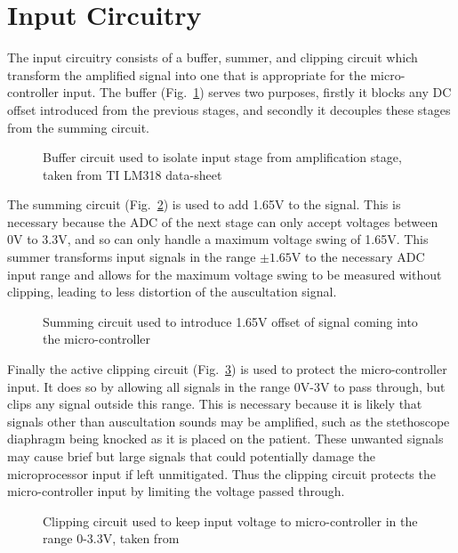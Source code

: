 \section{Input Circuitry}
The input circuitry consists of a buffer, summer, and clipping circuit which transform the amplified signal into one that is appropriate for the micro-controller input. The buffer (Fig.~\ref{fig:buffer_circuit}) serves two purposes, firstly it blocks any DC offset introduced from the previous stages, and secondly it decouples these stages from the summing circuit. 
\begin{figure}[!htb]
	\centering
	\caption{Buffer circuit used to isolate input stage from amplification stage, taken from TI LM318 data-sheet\cite{TILM318}}
	\label{fig:buffer_circuit}
\end{figure}
The summing circuit (Fig.~\ref{fig:summing_circuit}) is used to add 1.65V to the signal. This is necessary because the ADC of the next stage can only accept voltages between 0V to 3.3V, and so can only handle a maximum voltage swing of 1.65V. This summer transforms input signals in the range $\pm1.65$V to the necessary ADC input range and allows for the maximum voltage swing to be measured without clipping, leading to less distortion of the auscultation signal. 
\begin{figure}[!htb]
	\centering
	\caption{Summing circuit used to introduce 1.65V offset of signal coming into the micro-controller}
	\label{fig:summing_circuit}
\end{figure}
Finally the active clipping circuit (Fig.~\ref{fig:clipping_circuit}) is used to protect the micro-controller input. It does so by allowing all signals in the range 0V-3V to pass through, but clips any signal outside this range. This is necessary because it is likely that signals other than auscultation sounds may be amplified, such as the stethoscope diaphragm being knocked as it is placed on the patient. These unwanted signals may cause brief but large signals that could potentially damage the microprocessor input if left unmitigated. Thus the clipping circuit protects the micro-controller input by limiting the voltage passed through.

\begin{figure}[!htb]
	\centering
	\caption{Clipping circuit used to keep input voltage to micro-controller in the range 0-3.3V, taken from \cite[p.~221]{Horowitz1989}}
	\label{fig:clipping_circuit}
\end{figure}

